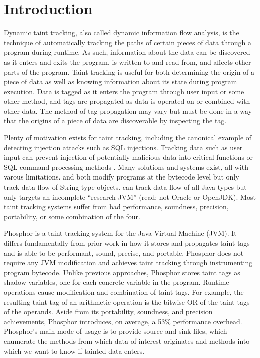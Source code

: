 \chapter{Introduction}

Dynamic taint tracking, also called dynamic information flow analysis,
is the technique of automatically tracking the paths of certain pieces
of data through a program during runtime. As such, information about
the data can be discovered as it enters and exits the program, is
written to and read from, and affects other parts of the
program. Taint tracking is useful for both determining the origin of a
piece of data as well as knowing information about its state during
program execution. Data is tagged as it enters the program through
user input or some other method, and tags are propagated as data is
operated on or combined with other data. The method of tag propagation
may vary but must be done in a way that the origins of a piece of data
are discoverable by inspecting the tag.

Plenty of motivation exists for taint tracking, including the
canonical example of detecting injection attacks such as SQL
injections. Tracking data such as user input can prevent injection of
potentially malicious data into critical functions or SQL command
processing methods \cite{sql1} \cite{sql2}. Many solutions and systems
exist, all with varous limitations. \cite{stringtaint} and \cite{sql1}
both modify programs at the bytecode level but only track data flow of
String-type objects. \cite{jikes} can track data flow of all Java
types but only targets an incomplete ``research JVM'' (read: not
Oracle or OpenJDK).  Most taint tracking systems suffer from bad
performance, soundness, precision, portability, or some combination of
the four.

Phosphor \cite{phosphor_oopsla} is a taint tracking system for the
Java Virtual Machine (JVM). It differs fundamentally from prior work
in how it stores and propagates taint tags and is able to be
performant, sound, precise, and portable. Phosphor does not require
any JVM modification and achieves taint tracking through instrumenting
program bytecode. Unlike previous approaches, Phosphor stores taint
tags as shadow variables, one for each concrete variable in the
program. Runtime operations cause modification and combination of
taint tags. For example, the resulting taint tag of an arithmetic
operation is the bitwise OR of the taint tags of the operands. Aside
from its portability, soundness, and precision achievements, Phosphor
introduces, on average, a 53\% performance overhead. Phosphor's main
mode of usage is to provide source and sink files, which enumerate the
methods from which data of interest originates and methods into which
we want to know if tainted data enters.

